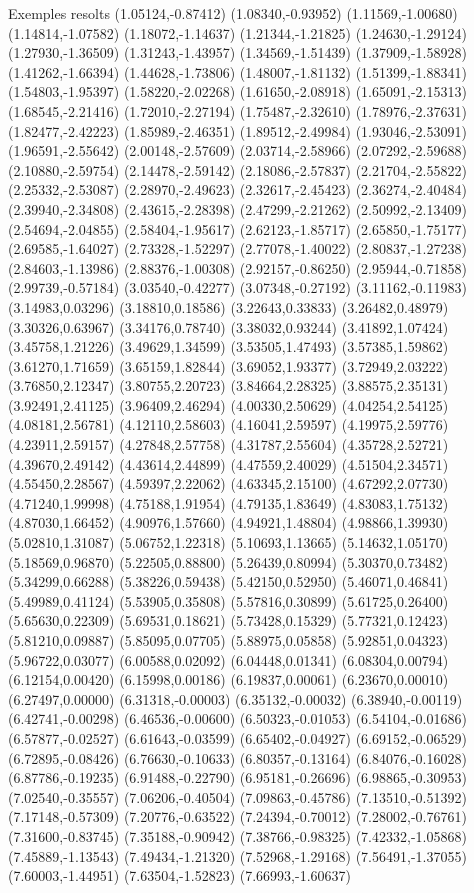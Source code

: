 \documentclass[11pt,a4paper]{article}
\begin{document}
\begin{fmex}{Exemples resolts}
(1.05124,-0.87412) (1.08340,-0.93952) (1.11569,-1.00680) (1.14814,-1.07582) (1.18072,-1.14637) (1.21344,-1.21825) (1.24630,-1.29124) (1.27930,-1.36509) (1.31243,-1.43957) (1.34569,-1.51439) (1.37909,-1.58928) (1.41262,-1.66394) (1.44628,-1.73806) (1.48007,-1.81132) (1.51399,-1.88341) (1.54803,-1.95397) (1.58220,-2.02268) (1.61650,-2.08918) (1.65091,-2.15313) (1.68545,-2.21416) (1.72010,-2.27194) (1.75487,-2.32610) (1.78976,-2.37631) (1.82477,-2.42223) (1.85989,-2.46351) (1.89512,-2.49984) (1.93046,-2.53091) (1.96591,-2.55642) (2.00148,-2.57609) (2.03714,-2.58966) (2.07292,-2.59688) (2.10880,-2.59754) (2.14478,-2.59142) (2.18086,-2.57837) (2.21704,-2.55822) (2.25332,-2.53087) (2.28970,-2.49623) (2.32617,-2.45423) (2.36274,-2.40484) (2.39940,-2.34808) (2.43615,-2.28398) (2.47299,-2.21262) (2.50992,-2.13409) (2.54694,-2.04855) (2.58404,-1.95617) (2.62123,-1.85717) (2.65850,-1.75177) (2.69585,-1.64027) (2.73328,-1.52297) (2.77078,-1.40022) (2.80837,-1.27238) (2.84603,-1.13986) (2.88376,-1.00308) (2.92157,-0.86250) (2.95944,-0.71858) (2.99739,-0.57184) (3.03540,-0.42277) (3.07348,-0.27192) (3.11162,-0.11983) (3.14983,0.03296) (3.18810,0.18586) (3.22643,0.33833) (3.26482,0.48979) (3.30326,0.63967) (3.34176,0.78740) (3.38032,0.93244) (3.41892,1.07424) (3.45758,1.21226) (3.49629,1.34599) (3.53505,1.47493) (3.57385,1.59862) (3.61270,1.71659) (3.65159,1.82844) (3.69052,1.93377) (3.72949,2.03222) (3.76850,2.12347) (3.80755,2.20723) (3.84664,2.28325) (3.88575,2.35131) (3.92491,2.41125) (3.96409,2.46294) (4.00330,2.50629) (4.04254,2.54125) (4.08181,2.56781) (4.12110,2.58603) (4.16041,2.59597) (4.19975,2.59776) (4.23911,2.59157) (4.27848,2.57758) (4.31787,2.55604) (4.35728,2.52721) (4.39670,2.49142) (4.43614,2.44899) (4.47559,2.40029) (4.51504,2.34571) (4.55450,2.28567) (4.59397,2.22062) (4.63345,2.15100) (4.67292,2.07730) (4.71240,1.99998) (4.75188,1.91954) (4.79135,1.83649) (4.83083,1.75132) (4.87030,1.66452) (4.90976,1.57660) (4.94921,1.48804) (4.98866,1.39930) (5.02810,1.31087) (5.06752,1.22318) (5.10693,1.13665) (5.14632,1.05170) (5.18569,0.96870) (5.22505,0.88800) (5.26439,0.80994) (5.30370,0.73482) (5.34299,0.66288) (5.38226,0.59438) (5.42150,0.52950) (5.46071,0.46841) (5.49989,0.41124) (5.53905,0.35808) (5.57816,0.30899) (5.61725,0.26400) (5.65630,0.22309) (5.69531,0.18621) (5.73428,0.15329) (5.77321,0.12423) (5.81210,0.09887) (5.85095,0.07705) (5.88975,0.05858) (5.92851,0.04323) (5.96722,0.03077) (6.00588,0.02092) (6.04448,0.01341) (6.08304,0.00794) (6.12154,0.00420) (6.15998,0.00186) (6.19837,0.00061) (6.23670,0.00010) (6.27497,0.00000) (6.31318,-0.00003) (6.35132,-0.00032) (6.38940,-0.00119) (6.42741,-0.00298) (6.46536,-0.00600) (6.50323,-0.01053) (6.54104,-0.01686) (6.57877,-0.02527) (6.61643,-0.03599) (6.65402,-0.04927) (6.69152,-0.06529) (6.72895,-0.08426) (6.76630,-0.10633) (6.80357,-0.13164) (6.84076,-0.16028) (6.87786,-0.19235) (6.91488,-0.22790) (6.95181,-0.26696) (6.98865,-0.30953) (7.02540,-0.35557) (7.06206,-0.40504) (7.09863,-0.45786) (7.13510,-0.51392) (7.17148,-0.57309) (7.20776,-0.63522) (7.24394,-0.70012) (7.28002,-0.76761) (7.31600,-0.83745) (7.35188,-0.90942) (7.38766,-0.98325) (7.42332,-1.05868) (7.45889,-1.13543) (7.49434,-1.21320) (7.52968,-1.29168) (7.56491,-1.37055) (7.60003,-1.44951) (7.63504,-1.52823) (7.66993,-1.60637) 
\end{fmex}
\end{document}
